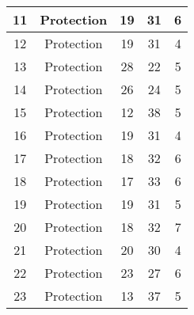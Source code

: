 \documentclass[results.tex]{subfiles}
\begin{document}
\begin{center}
\begin{tabular}{| c || c | c | c | c |}
            \hline
            11                      & Protection                   & 19                     & 31                      & 6                    \\
            \hline
            12                      & Protection                   & 19                     & 31                      & 4                    \\
            \hline
            13                      & Protection                   & 28                     & 22                      & 5                    \\
            \hline
            14                      & Protection                   & 26                     & 24                      & 5                    \\
            \hline
            15                      & Protection                   & 12                     & 38                      & 5                    \\
            \hline
            16                      & Protection                   & 19                     & 31                      & 4                    \\
            \hline
            17                      & Protection                   & 18                     & 32                      & 6                    \\
            \hline
            18                      & Protection                   & 17                     & 33                      & 6                    \\
            \hline
            19                      & Protection                   & 19                     & 31                      & 5                    \\
            \hline
            20                      & Protection                   & 18                     & 32                      & 7                    \\
            \hline
            21                      & Protection                   & 20                     & 30                      & 4                    \\
            \hline
            22                      & Protection                   & 23                     & 27                      & 6                    \\
            \hline
            23                      & Protection                   & 13                     & 37                      & 5                    \\

\end{tabular}
\end{center}
\end{document}
